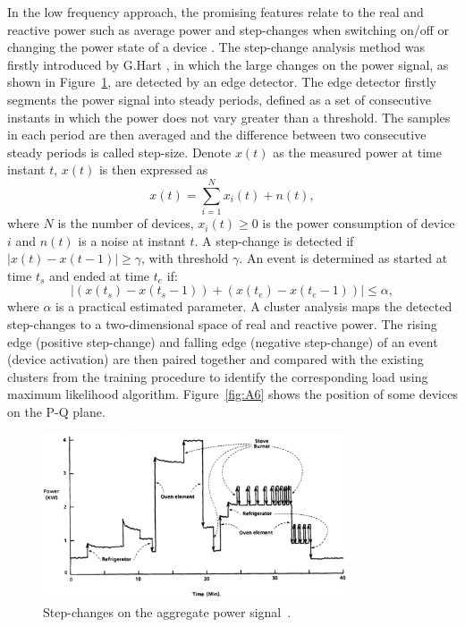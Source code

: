 In the low frequency approach, the promising features relate to the real and reactive power such as average power and step-changes when switching on/off or changing the power state of a device \cite{Hart92,Drenker99}. The step-change analysis method was firstly introduced by G.Hart \cite{Hart92}, in which the large changes on the power signal, as shown in Figure~\ref{fig:A4}, are detected by an edge detector. The edge detector firstly segments the power signal into steady periods, defined as a set of consecutive instants in which the power does not vary greater than a threshold. The samples in each period are then averaged and the difference between two consecutive steady periods is called step-size. Denote $x(t)$ as the measured power at time instant $t$, $x(t)$ is then expressed as
\begin{equation}
x(t) = \sum_{i=1}^N{x_i(t)+n(t)},
\end{equation}
where $N$ is the number of devices, $x_i(t)\geq 0 $ is the power consumption of device $i$ and $n(t)$ is a noise at instant $t$. A step-change is detected if $|x(t)-x(t-1)|\geq \gamma$, with threshold $\gamma$. An event is determined as started at time $t_s$ and ended at time $t_e$ if:
\begin{equation}
\left|(x(t_s)-x(t_s-1))+(x(t_e)-x(t_e-1))\right|\leq \alpha,
\end{equation}
where $\alpha$ is a practical estimated parameter.  A cluster analysis maps the detected step-changes to a two-dimensional space of real and reactive power. The rising edge (positive step-change) and falling edge (negative step-change) of an event (device activation) are then paired together and compared with the existing clusters from the training procedure to identify the corresponding load using maximum likelihood algorithm. Figure~\ref{fig:A6} shows the position of some devices on the P-Q plane.

\begin{figure}
\centering
\includegraphics[width=0.8\textwidth]{./chapters/chapter2/images/step-change.pdf} 
\caption{Step-changes on the aggregate power signal~\cite{Hart92}.} 
\label{fig:A4} 
\end{figure}

